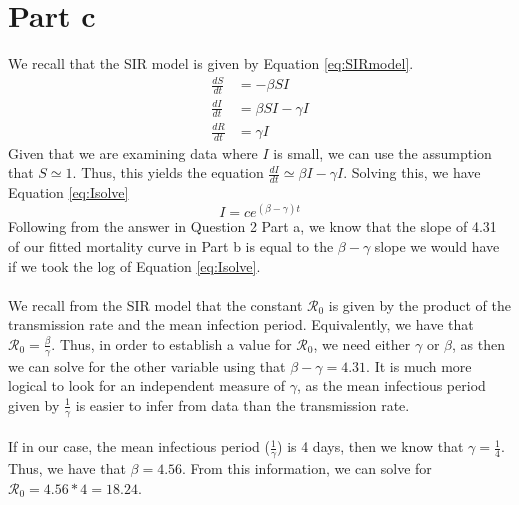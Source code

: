 \documentclass{article}
\newcommand{\R}{{\mathcal R}}
\begin{document}
\section*{Part c}
We recall that the SIR model is given by Equation \ref{eq:SIRmodel}.
\begin{equation}
\label{eq:SIRmodel}
\begin{aligned}
\frac{dS}{dt}&=-\beta SI \\
\frac{dI}{dt}&=\beta SI - \gamma I \\
\frac{dR}{dt}&=\gamma I 
\end{aligned}
\end{equation}
Given that we are examining data where $I$ is small, we can use the assumption that $S\simeq 1$. Thus, this yields the equation $\frac{dI}{dt}\simeq\beta I - \gamma I$. Solving this, we have Equation \ref{eq:Isolve}
\begin{equation}
\label{eq:Isolve}
I=ce^{(\beta - \gamma)t}
\end{equation}
Following from the answer in Question 2 Part a, we know that the slope of 4.31 of our fitted mortality curve in Part b is equal to the $\beta - \gamma$ slope we would have if we took the log of Equation \ref{eq:Isolve}.
\\\\
We recall from the SIR model that the constant $\R_0$ is given by the product of the transmission rate and the mean infection period. Equivalently, we have that $\R_0 = \frac{\beta}{\gamma}$. Thus, in order to establish a value for $\R_0$, we need either $\gamma$ or $\beta$, as then we can solve for the other variable using that $\beta - \gamma = 4.31$. It is much more logical to look for an independent measure of $\gamma$, as the mean infectious period given by $\frac{1}{\gamma}$ is easier to infer from data than the transmission rate. 
\\\\
If in our case, the mean infectious period ($\frac{1}{\gamma}$) is 4 days, then we know that $\gamma = \frac{1}{4}$. Thus, we have that $\beta=4.56$. From this information, we can solve for $\R_0 = 4.56*4 = 18.24$.
\end{document}
